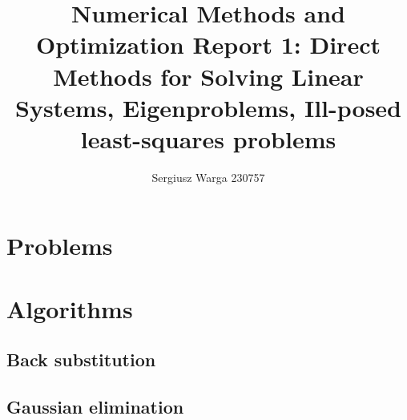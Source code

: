 \documentclass[a4paper]{article}
\title{Numerical Methods and Optimization
  Report 1:
  Direct Methods for Solving Linear Systems,
  Eigenproblems,
  Ill-posed least-squares problems}
\author{Sergiusz Warga 230757}
\date{}
\begin{document}
\maketitle
\tableofcontents
\pagebreak

\section{Problems}



\clearpage

\section{Algorithms}
\subsection{Back substitution}%
\label{algorithm:back_substitution}

\subsection{Gaussian elimination}%
\label{algorithm:gaussian_elimination}

% 
% 
% 
% 

\clearpage

\nocite{Zdunek, GoluVanl96, Meyer}


\end{document}
